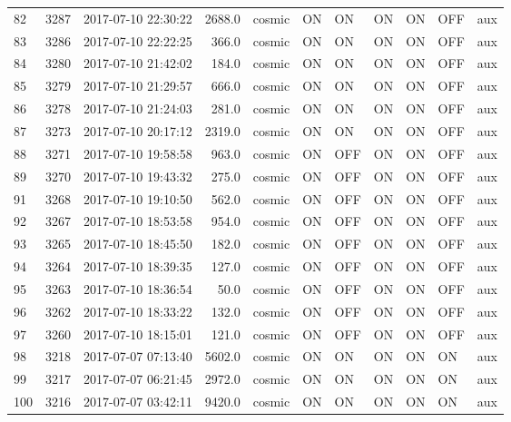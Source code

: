 \begin{longtable}{lrlrlllllll}
82  &  3287 &  2017-07-10 22:30:22 &    2688.0 &   cosmic &  ON &   ON &   ON &  ON &  OFF &       aux\\
83  &  3286 &  2017-07-10 22:22:25 &     366.0 &   cosmic &  ON &   ON &   ON &  ON &  OFF &       aux\\
84  &  3280 &  2017-07-10 21:42:02 &     184.0 &   cosmic &  ON &   ON &   ON &  ON &  OFF &       aux\\
85  &  3279 &  2017-07-10 21:29:57 &     666.0 &   cosmic &  ON &   ON &   ON &  ON &  OFF &       aux\\
86  &  3278 &  2017-07-10 21:24:03 &     281.0 &   cosmic &  ON &   ON &   ON &  ON &  OFF &       aux\\
87  &  3273 &  2017-07-10 20:17:12 &    2319.0 &   cosmic &  ON &   ON &   ON &  ON &  OFF &       aux\\
88  &  3271 &  2017-07-10 19:58:58 &     963.0 &   cosmic &  ON &  OFF &   ON &  ON &  OFF &       aux\\
89  &  3270 &  2017-07-10 19:43:32 &     275.0 &   cosmic &  ON &  OFF &   ON &  ON &  OFF &       aux\\
91  &  3268 &  2017-07-10 19:10:50 &     562.0 &   cosmic &  ON &  OFF &   ON &  ON &  OFF &       aux\\
92  &  3267 &  2017-07-10 18:53:58 &     954.0 &   cosmic &  ON &  OFF &   ON &  ON &  OFF &       aux\\
93  &  3265 &  2017-07-10 18:45:50 &     182.0 &   cosmic &  ON &  OFF &   ON &  ON &  OFF &       aux\\
94  &  3264 &  2017-07-10 18:39:35 &     127.0 &   cosmic &  ON &  OFF &   ON &  ON &  OFF &       aux\\
95  &  3263 &  2017-07-10 18:36:54 &      50.0 &   cosmic &  ON &  OFF &   ON &  ON &  OFF &       aux\\
96  &  3262 &  2017-07-10 18:33:22 &     132.0 &   cosmic &  ON &  OFF &   ON &  ON &  OFF &       aux\\
97  &  3260 &  2017-07-10 18:15:01 &     121.0 &   cosmic &  ON &  OFF &   ON &  ON &  OFF &       aux\\
98  &  3218 &  2017-07-07 07:13:40 &    5602.0 &   cosmic &  ON &   ON &   ON &  ON &   ON &       aux\\
99  &  3217 &  2017-07-07 06:21:45 &    2972.0 &   cosmic &  ON &   ON &   ON &  ON &   ON &       aux\\
100 &  3216 &  2017-07-07 03:42:11 &    9420.0 &   cosmic &  ON &   ON &   ON &  ON &   ON &       aux\\

\end{longtable}
